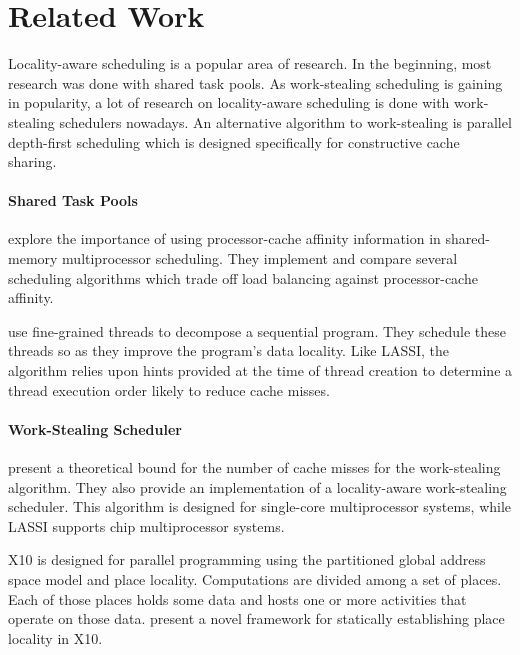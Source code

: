 
\chapter{Related Work}
\label{chap:locality-related-work}

Locality-aware scheduling is a popular area of research. In the
beginning, most research was done with shared task pools. As
work-stealing scheduling is gaining in popularity, a lot of research
on locality-aware scheduling is done with work-stealing schedulers
nowadays. An alternative algorithm to work-stealing is parallel
depth-first scheduling which is designed specifically for constructive
cache sharing.

\subsubsection{Shared Task Pools}

\textcite{Squillante1993} explore the importance of using
processor-cache affinity information in shared-memory multiprocessor
scheduling. They implement and compare several scheduling algorithms
which trade off load balancing against processor-cache affinity.

\textcite{Philbin1996} use fine-grained threads to decompose a
sequential program. They schedule these threads so as they improve the
program's data locality. Like LASSI, the algorithm relies upon hints
provided at the time of thread creation to determine a thread
execution order likely to reduce cache misses.

\subsubsection{Work-Stealing Scheduler}

\textcite{Acar2000} present a theoretical bound for the number of
cache misses for the work-stealing algorithm. They also provide an
implementation of a locality-aware work-stealing scheduler. This
algorithm is designed for single-core multiprocessor systems, while
LASSI supports chip multiprocessor systems.

X10 \cite{Charles2005, Saraswat2010} is designed for parallel
programming using the partitioned global address space model and place
locality. Computations are divided among a set of places. Each of
those places holds some data and hosts one or more activities that
operate on those data. \textcite{Agarwal2008} present a novel
framework for statically establishing place locality in X10.

